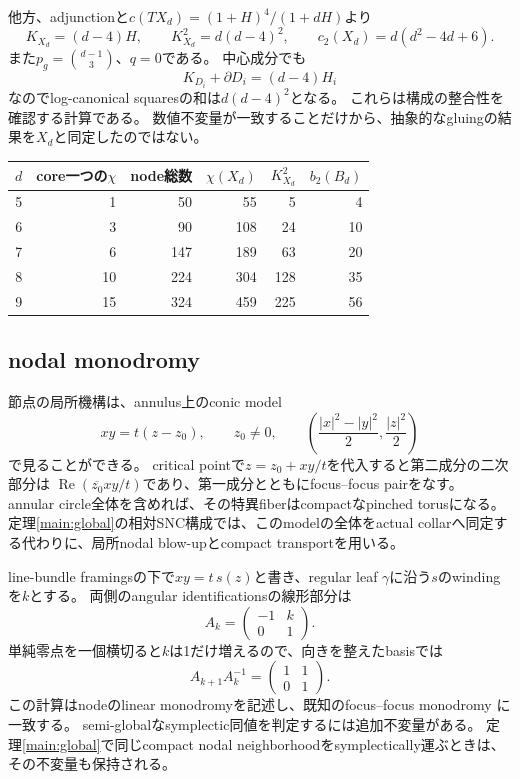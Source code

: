 他方、adjunctionと$c(TX_d)=(1+H)^4/(1+dH)$より
\[
K_{X_d}=(d-4)H,\qquad K_{X_d}^2=d(d-4)^2,\qquad
c_2(X_d)=d(d^2-4d+6).
\]
また$p_g=\binom{d-1}{3}$、$q=0$である。
中心成分でも
\[
K_{D_i}+\partial D_i=(d-4)H_i
\]
なのでlog-canonical squaresの和は$d(d-4)^2$となる。
これらは構成の整合性を確認する計算である。
数値不変量が一致することだけから、抽象的なgluingの結果を$X_d$と同定したのではない。

\begin{center}
\begin{tabular}{@{}rrrrrr@{}}
\toprule
$d$ & core一つの$\chi$ & node総数 & $\chi(X_d)$ & $K_{X_d}^2$ & $b_2(B_d)$\\
\midrule
5&1&50&55&5&4\\
6&3&90&108&24&10\\
7&6&147&189&63&20\\
8&10&224&304&128&35\\
9&15&324&459&225&56\\
\bottomrule
\end{tabular}
\end{center}

\subsection{nodal monodromy}\label{inv:nodal-monodromy}
節点の局所機構は、annulus上のconic model
\[
xy=t(z-z_0),\qquad z_0\ne0,
\qquad \left(\frac{|x|^2-|y|^2}{2},\frac{|z|^2}{2}\right)
\]
で見ることができる。
critical pointで$z=z_0+xy/t$を代入すると第二成分の二次部分は
$\operatorname{Re}(\overline{z_0}xy/t)$であり、第一成分とともにfocus--focus pairをなす。
annular circle全体を含めれば、その特異fiberはcompactなpinched torusになる。
定理\ref{main:global}の相対SNC構成では、このmodelの全体をactual collarへ同定する代わりに、局所nodal blow-upとcompact transportを用いる。

line-bundle framingsの下で$xy=t\,s(z)$と書き、regular leaf $\gamma$に沿う$s$のwindingを$k$とする。
両側のangular identificationsの線形部分は
\[
A_k=\begin{pmatrix}-1&k\\0&1\end{pmatrix}.
\]
単純零点を一個横切ると$k$は1だけ増えるので、向きを整えたbasisでは
\[
A_{k+1}A_k^{-1}=\begin{pmatrix}1&1\\0&1\end{pmatrix}.
\]
この計算はnodeのlinear monodromyを記述し、既知のfocus--focus monodromy
\cite[\S3, Corollary~1]{ZungFocus}に一致する。
semi-globalなsymplectic同値を判定するには追加不変量がある\cite{VuNgoc}。
定理\ref{main:global}で同じcompact nodal neighborhoodをsymplectically運ぶときは、
その不変量も保持される。

